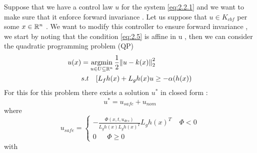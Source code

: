  Suppose that we have a control law $u$ for the system  \ref{eq:2.2.1} and we want to make sure that it enforce forward invariance . Let us suppose that $ u \in K_{cbf}$ per some $x \in \mathbb{R}^n$ . We want to modify this controller to ensure forward invariance , we start by noting that the condition \ref{eq:2.5}  is affine in u , then we can consider the quadratic programming problem (QP)
 \begin{align*}
 	u(x) &= \operatorname*{argmin}_{u \in U \subseteq \mathbb{R}^n} \frac{1}{2}\norm{u - k(x)}_2^2 \\
 &	s.t \ \ \ [L_f h(x) + L_g h(x) u \geq - \alpha (h(x))
 \end{align*}
For this for this problem there exists a solution  $u^*$ in closed form : 
 \begin{equation}
u^*  = u_{safe} + u_{nom}
\label{eq_star}
 \end{equation} where 
 \begin{equation}
 u_{safe} = \begin{cases}
 	- \frac{\Phi ( x , t , u_{des})}{L_gh(x)L_gh(x)^T} L_gh(x)^T   \ \ \ \ \ \Phi < 0 \\
 	0 \ \ \ \ \ \ \ \Phi \geq  0 
 \end{cases} 
 \label{eq_safe}
 \end{equation}
 with 
 
